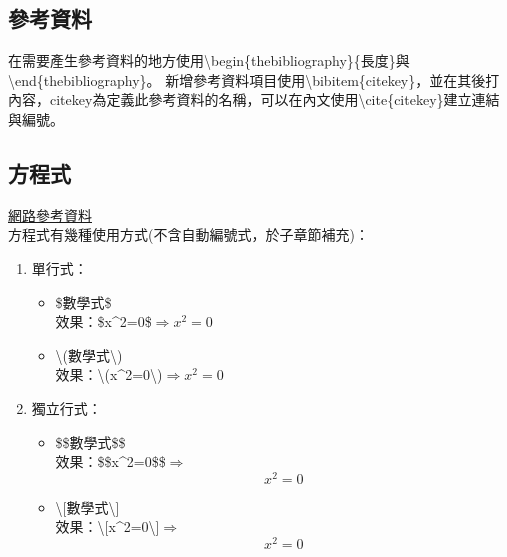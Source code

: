 \documentclass[12pt]{article}
\begin{document}
\begin{CJK*}{UTF8}{bsmi}
			\subsection{參考資料}
				\hspace*{2pc}在需要產生參考資料的地方使用\textbackslash begin\{thebibliography\}\{長度\}與\textbackslash end\{thebibliography\}。
				新增參考資料項目使用\textbackslash bibitem\{citekey\}，並在其後打內容，citekey為定義此參考資料的名稱，可以在內文使用\textbackslash cite\{citekey\}建立連結與編號。
			
			\subsection{方程式}
				\href{https://codertw.com/\%E7\%A8\%8B\%E5\%BC\%8F\%E8\%AA\%9E\%E8\%A8\%80/562803/}{網路參考資料} \\
				方程式有幾種使用方式(不含自動編號式，於子章節補充)：
				\begin{enumerate}[1.]
					\item 單行式：
						\begin{itemize}
							\item \$數學式\$ \\
								效果：\$x\string^2=0\$$\Rightarrow x^2=0$
							\item \textbackslash(數學式\textbackslash) \\
								效果：\textbackslash(x\string^2=0\textbackslash)\(\Rightarrow x^2=0\)
						\end{itemize}
					\item 獨立行式：
						\begin{itemize}
							\item \$\$數學式\$\$ \\
								效果：\$\$x\string^2=0\$\$$\Rightarrow$$$x^2=0$$
							\item \textbackslash[數學式\textbackslash] \\
								效果：\textbackslash[x\string^2=0\textbackslash]$\Rightarrow$\[x^2=0\]
						\end{itemize}
				\end{enumerate}

\end{CJK*}
\end{document}
